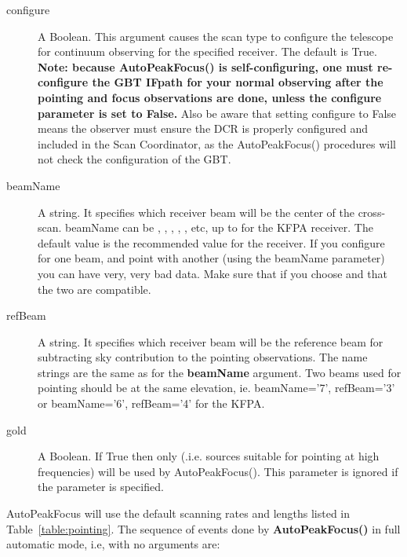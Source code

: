 \begin{description}
\item[configure] A Boolean. This argument causes the scan type to configure 
the telescope for continuum observing for the specified receiver. The default 
is True. {\bf Note: because AutoPeakFocus() is self-configuring, one must 
re-configure the \gls{GBT} \gls{IFpath} for your normal observing after the pointing
and focus observations are done, unless the configure parameter is set to False.}
Also be aware that setting configure to False means the observer must ensure
the \gls{DCR} is properly configured and included in the Scan Coordinator, as
the AutoPeakFocus() procedures will not check the configuration of the \gls{GBT}.

\item[beamName] A string. It specifies which receiver beam will be the center
of the cross-scan. beamName can be , , , , , etc,
up to  for the \gls{KFPA} receiver.  The default value is the recommended
value for the receiver. If you configure for one beam, and point with another
(using the beamName parameter) you can have very, very bad data. Make sure that
if you choose  and  that the two are compatible.  

\item[refBeam] A string. It specifies which receiver beam will be the reference
beam for subtracting sky contribution to the pointing observations. The name
strings are the same as for the {\bf beamName} argument. Two beams used for
pointing should be at the same elevation,  ie. beamName='7', refBeam='3' or
beamName='6', refBeam='4' for the \gls{KFPA}.

\item[gold] A Boolean.  If True then only  (.i.e. 
sources suitable for pointing at high frequencies) will be used by 
AutoPeakFocus().  This parameter is ignored if the  parameter is
specified.
\end{description}

\noindent AutoPeakFocus will use the default scanning rates and lengths listed
in Table~\ref{table:pointing}.  The sequence of events done by
{\bfseries{\textcolor{pythonKeywords}{AutoPeakFocus}}()} in full automatic
mode, i.e, with no arguments are:

